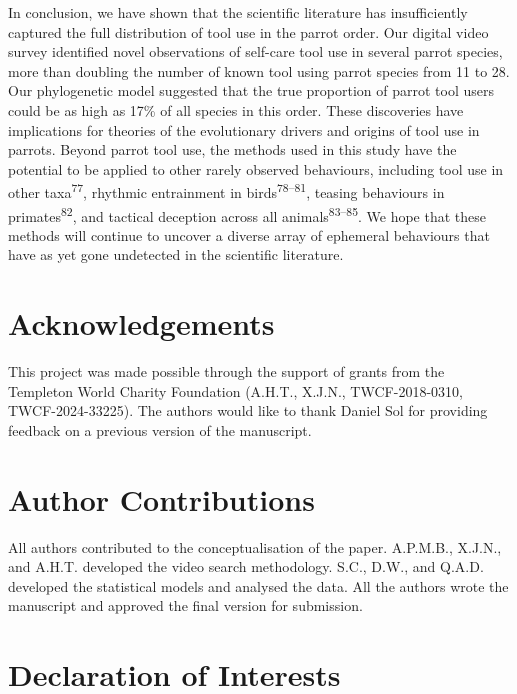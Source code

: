 \documentclass[
  man, donotrepeattitle,floatsintext]{apa6}
\begin{document}
In conclusion, we have shown that the scientific literature has insufficiently
captured the full distribution of tool use in the parrot order. Our
digital video survey identified novel observations of self-care tool use in
several parrot species, more than doubling the number of known tool using parrot
species from 11 to 28. Our phylogenetic model suggested that the true
proportion of parrot tool users could be as high as 17\% of all species in this
order. These discoveries have implications for theories of the evolutionary
drivers and origins of tool use in parrots. Beyond parrot tool use, the
methods used in this study have the potential to be applied to other rarely
observed behaviours, including tool use in other taxa\textsuperscript{77}, rhythmic
entrainment in birds\textsuperscript{78--81},
teasing behaviours in primates\textsuperscript{82}, and tactical deception across all
animals\textsuperscript{83--85}. We hope that these methods
will continue to uncover a diverse array of ephemeral behaviours that have as
yet gone undetected in the scientific literature.

\newpage
\nolinenumbers

\hypertarget{acknowledgements}{%
\section{Acknowledgements}\label{acknowledgements}}

This project was made possible through the support of grants from the Templeton
World Charity Foundation (A.H.T., X.J.N., TWCF-2018-0310, TWCF-2024-33225). The
authors would like to thank Daniel Sol for providing feedback on a previous
version of the manuscript.

\hypertarget{author-contributions}{%
\section{Author Contributions}\label{author-contributions}}

All authors contributed to the conceptualisation of the paper. A.P.M.B., X.J.N.,
and A.H.T. developed the video search methodology. S.C., D.W., and Q.A.D.
developed the statistical models and analysed the data. All the authors wrote
the manuscript and approved the final version for submission.

\hypertarget{declaration-of-interests}{%
\section{Declaration of Interests}\label{declaration-of-interests}}
\end{document}
